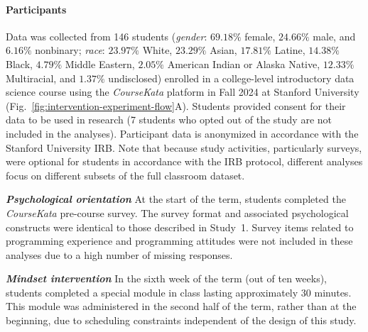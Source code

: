 \documentclass[10pt,letterpaper]{article}
\newcommand{\ck}{\textit{CourseKata}}
\begin{document}
\paragraph{Participants}
Data was collected from 146 students (\textit{gender}: $69.18\%$ female, $24.66\%$ male, and $6.16\%$ nonbinary; 
\textit{race}: $23.97\%$ White, $23.29\%$ Asian, $17.81\%$ Latine, $14.38\%$ Black, $4.79\%$ Middle Eastern, $2.05\%$ American Indian or Alaska Native, $12.33\%$ Multiracial, and $1.37\%$ undisclosed) enrolled in a college-level introductory data science course using the \ck{} platform in Fall 2024 at Stanford University (Fig.~\ref{fig:intervention-experiment-flow}A). 
Students provided consent for their data to be used in research (7 students who opted out of the study are not included in the analyses). 
Participant data is anonymized in accordance with the Stanford University IRB. 
Note that because study activities, particularly surveys, were optional for students in accordance with the IRB protocol, different analyses focus on different subsets of the full classroom dataset.


\noindent \textbf{\textit{Psychological orientation}}
At the start of the term, students completed the \ck{} pre-course survey. 
The survey format and associated psychological constructs were identical to those described in Study~1. 
Survey items related to programming experience and programming attitudes were not included in these analyses due to a high number of missing responses.

\noindent \textbf{\textit{Mindset intervention}}
In the sixth week of the term (out of ten weeks), students completed a special module in class lasting approximately 30 minutes.
This module was administered in the second half of the term, rather than at the beginning, due to scheduling constraints independent of the design of this study.
\end{document}
